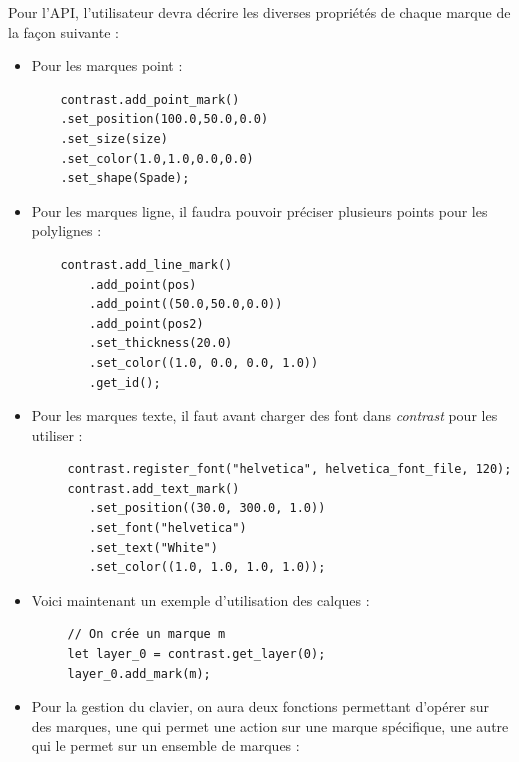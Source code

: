\documentclass[12pt]{article}
\begin{document}
Pour l'API, l'utilisateur devra décrire les diverses propriétés de chaque marque de la façon suivante :
\begin{itemize}
    \item Pour les marques point :

    \begin{verbatim}
    contrast.add_point_mark()
	.set_position(100.0,50.0,0.0)
	.set_size(size)
    .set_color(1.0,1.0,0.0,0.0)
	.set_shape(Spade);
    \end{verbatim}

    \item Pour les marques ligne, il faudra pouvoir préciser plusieurs points pour les polylignes :
    \begin{verbatim}
    contrast.add_line_mark()
		.add_point(pos)
        .add_point((50.0,50.0,0.0))
        .add_point(pos2)
        .set_thickness(20.0)
        .set_color((1.0, 0.0, 0.0, 1.0))
        .get_id();
    \end{verbatim}
    \item Pour les marques texte, il faut avant charger des font dans \textit{contrast} pour les utiliser :
     \begin{verbatim}
     contrast.register_font("helvetica", helvetica_font_file, 120);
     contrast.add_text_mark()
        .set_position((30.0, 300.0, 1.0))
        .set_font("helvetica")
        .set_text("White")
        .set_color((1.0, 1.0, 1.0, 1.0));
    \end{verbatim}
    \item Voici maintenant un exemple d'utilisation des calques :
    \begin{verbatim}
     // On crée un marque m
     let layer_0 = contrast.get_layer(0);
     layer_0.add_mark(m);
    \end{verbatim}
    \item Pour la gestion du clavier, on aura deux fonctions permettant d'opérer sur des marques, une qui permet une action 
sur une marque spécifique, une autre qui le permet sur un ensemble
    de marques :
    \begin{verbatim}

\end{verbatim}
\end{itemize}
\end{document}
